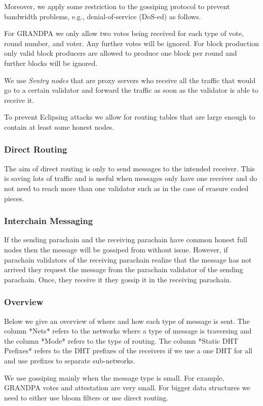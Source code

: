 Moreover, we apply some restriction to the gossiping protocol to prevent bandwidth problems, e.g., denial-of-service (DoS-ed) as follows.

For GRANDPA we only allow two votes being received for each type of vote, round number, and voter. Any further votes will be ignored.
For block production only valid block producers are allowed to produce one block per round and further blocks will be ignored.

We use \emph{Sentry nodes} that are proxy servers who receive all the traffic that would go to a certain validator and forward the traffic as soon as the validator is able to receive it.

To prevent Eclipsing attacks \cite{} we allow for routing tables that are large enough to contain at least some honest nodes.

\subsubsection{Direct Routing}
The aim of direct routing is only to send messages to the intended receiver.
This is saving lots of traffic and is useful when messages only have one receiver and do not need to reach more than one validator such as in the case of erasure coded pieces.

\subsubsection{Interchain Messaging}
If the sending parachain and the receiving parachain have common honest full nodes then the message will be gossiped from without issue.
However, if parachain validators of the receiving parachain realize that the message has not arrived they request the message from the parachain validator of the sending parachain.
Once, they receive it they gossip it in the receiving parachain.

\subsubsection{Overview}
Below we give an overview of where and how each type of message is sent. The column *Nets* refers to the networks where a type of message is traversing and the column *Mode* refers to the type of  routing. The column *Static DHT Prefixes* refers to the DHT prefixes of the receivers if we use a one DHT for all and use prefixes to separate sub-networks.

We use gossiping mainly when the message type is small. For example, GRANDPA votes and attestation are very small. For bigger data structures we need to either use bloom filters or use direct routing.

